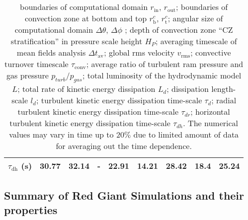 \documentclass[10pt,paper=a4]{report}
\begin{document}
\begin{table}[!h]
{\begin{tabular}{|l c c c c c c c c|}
$\tau_\mathrm{dh}$ (s)                & 30.77 & 32.14 & - & 22.91 & 14.21 & 28.42 & 18.4 & 25.24  \\
\hline
\end{tabular}}
\caption{boundaries of computational domain $r_\mathrm{in}$, $r_\mathrm{out}$; boundaries of convection zone at bottom and top $r_\mathrm{b}^c$, $r_\mathrm{t}^c$; angular size of computational domain $\Delta \theta$, $\Delta \phi$ ; depth of convection zone ``CZ stratification'' in pressure scale height $H_P$; averaging timescale of mean fields analysis $\Delta t_\mathrm{av}$; global rms velocity $v_\mathrm{rms}$; convective turnover timescale $\tau_\mathrm{conv}$; average ratio of turbulent ram pressure and gas pressure $p_{turb}/p_{gas}$; total luminosity of the hydrodynamic model $L$; total rate of kinetic energy dissipation $L_d$; dissipation length-scale  $l_d$; turbulent kinetic energy dissipation time-scale $\tau_d$; radial turbulent kinetic energy dissipation time-scale $\tau_{dr}$; horizontal turbulent kinetic energy dissipation time-scale $\tau_{dh}$. The numerical values may vary in time up to 20$\%$ due to limited amount of data for averaging out the time dependence.}
\label{tab:ob-models} 
\end{table}

\newpage

\subsection{Summary of Red Giant Simulations and their properties}

\vspace{1.cm}
\end{document}
